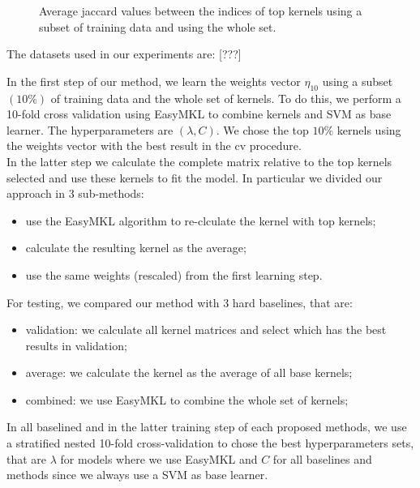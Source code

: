 \documentclass{esannV2}
\newcommand{\1}{{\bf 1}}
\begin{document}
\begin{figure}[htb]
\centering
{}
\caption{Average jaccard values between the indices of top kernels using a subset of training data and using the whole set.}
\label{fig:jaccard}
\end{figure}

The datasets used in our experiments are: [???]

In the first step of our method, we learn the weights vector $\eta_{10}$ using a subset $(10\%)$ of training data and the whole set of kernels. To do this, we perform a 10-fold cross validation using EasyMKL to combine kernels and SVM as base learner. The hyperparameters are $(\lambda,C)$. We chose the top $10\%$ kernels using the weights vector with the best result in the cv procedure.\\
In the latter step we calculate the complete matrix relative to the top kernels selected and use these kernels to fit the model. In particular we divided our approach in 3 sub-methods:
\begin{itemize}
\item{}use the EasyMKL algorithm to re-clculate the kernel with top kernels;
\item{}calculate the resulting kernel as the average;
\item{}use the same weights (rescaled) from the first learning step.
\end{itemize}
For testing, we compared our method with 3 hard baselines, that are:
\begin{itemize}
\item{}validation: we calculate all kernel matrices and select which has the best results in validation;
\item{}average: we calculate the kernel as the average of all base kernels;
\item{}combined: we use EasyMKL to combine the whole set of kernels;
\end{itemize}
In all baselined and in the latter training step of each proposed methods, we use a stratified nested 10-fold cross-validation to chose the best hyperparameters sets, that are $\lambda$ for models where we use EasyMKL and $C$ for all baselines and methods since we always use a SVM as base learner.
\end{document}
